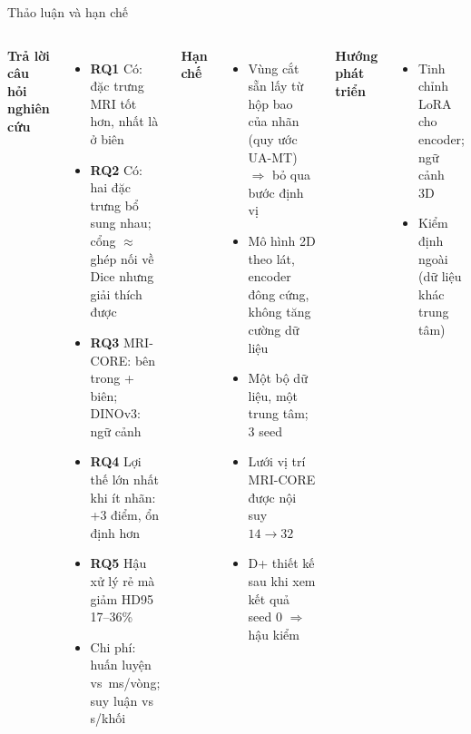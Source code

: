 \documentclass[aspectratio=169,10pt]{beamer}
\newcommand{\hl}[1]{{\color{ptitred}\textbf{#1}}}
\begin{document}
\begin{frame}{Thảo luận và hạn chế}
\begin{columns}[T]
\hl{Trả lời câu hỏi nghiên cứu}
\begin{itemize}\small
\item \textbf{RQ1} Có: đặc trưng MRI tốt hơn, nhất là ở biên
\item \textbf{RQ2} Có: hai đặc trưng bổ sung nhau; cổng $\approx$ ghép nối về Dice nhưng giải thích được
\item \textbf{RQ3} MRI-CORE: bên trong + biên; DINOv3: ngữ cảnh
\item \textbf{RQ4} Lợi thế lớn nhất khi ít nhãn: +3 điểm, ổn định hơn
\item \textbf{RQ5} Hậu xử lý rẻ mà giảm HD95 17--36\%
\item Chi phí: huấn luyện \TrainMsGate{} vs \TrainMsUnet\,ms/vòng; suy luận \InferGate{} vs \InferUnet\,s/khối
\end{itemize}
\hl{Hạn chế}
\begin{itemize}\small
\item Vùng cắt sẵn lấy từ hộp bao của nhãn (quy ước UA-MT) $\Rightarrow$ bỏ qua bước định vị
\item Mô hình 2D theo lát, encoder đông cứng, không tăng cường dữ liệu
\item Một bộ dữ liệu, một trung tâm; 3 seed
\item Lưới vị trí MRI-CORE được nội suy $14\to32$
\item D+ thiết kế sau khi xem kết quả seed 0 $\Rightarrow$ hậu kiểm
\end{itemize}
\hl{Hướng phát triển}
\begin{itemize}\small
\item Tinh chỉnh LoRA cho encoder; ngữ cảnh 3D
\item Kiểm định ngoài (dữ liệu khác trung tâm)
\end{itemize}
\end{columns}
\end{frame}
\end{document}
